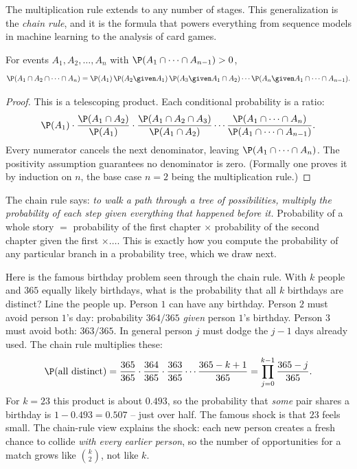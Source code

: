 The multiplication rule extends to any number of stages. This generalization is the \emph{chain rule}, and it is the formula that powers everything from sequence models in machine learning to the analysis of card games.

\begin{theorem}
\label{ch04:chain-rule}
For events $A_1, A_2, \dots, A_n$ with $\P(A_1 \cap \cdots \cap A_{n-1}) > 0$,
\[
\P(A_1 \cap A_2 \cap \cdots \cap A_n)
= \P(A_1)\,\P(A_2 \given A_1)\,\P(A_3 \given A_1 \cap A_2)\cdots
\P(A_n \given A_1 \cap \cdots \cap A_{n-1}).
\]
\end{theorem}

\begin{proof}
This is a telescoping product. Each conditional probability is a ratio:
\[
\P(A_1)\cdot\frac{\P(A_1\cap A_2)}{\P(A_1)}\cdot\frac{\P(A_1\cap A_2 \cap A_3)}{\P(A_1\cap A_2)}\cdots
\frac{\P(A_1\cap \cdots \cap A_n)}{\P(A_1\cap \cdots \cap A_{n-1})}.
\]
Every numerator cancels the next denominator, leaving $\P(A_1 \cap \cdots \cap A_n)$. The positivity assumption guarantees no denominator is zero. (Formally one proves it by induction on $n$, the base case $n=2$ being the multiplication rule.)
\end{proof}

\begin{intuitionbox}
The chain rule says: \emph{to walk a path through a tree of possibilities, multiply the probability of each step given everything that happened before it.} Probability of a whole story $=$ probability of the first chapter $\times$ probability of the second chapter given the first $\times \dots$. This is exactly how you compute the probability of any particular branch in a probability tree, which we draw next.
\end{intuitionbox}

\begin{example}
\label{ch04:ex-birthday-chain}
Here is the famous birthday problem seen through the chain rule. With $k$ people and $365$ equally likely birthdays, what is the probability that all $k$ birthdays are distinct? Line the people up. Person $1$ can have any birthday. Person $2$ must avoid person $1$'s day: probability $364/365$ \emph{given} person $1$'s birthday. Person $3$ must avoid both: $363/365$. In general person $j$ must dodge the $j-1$ days already used. The chain rule multiplies these:
\[
\P(\text{all distinct}) = \frac{365}{365}\cdot\frac{364}{365}\cdot\frac{363}{365}\cdots\frac{365-k+1}{365}
= \prod_{j=0}^{k-1}\frac{365-j}{365}.
\]
For $k = 23$ this product is about $0.493$, so the probability that \emph{some} pair shares a birthday is $1 - 0.493 = 0.507$ -- just over half. The famous shock is that $23$ feels small. The chain-rule view explains the shock: each new person creates a fresh chance to collide \emph{with every earlier person}, so the number of opportunities for a match grows like $\binom{k}{2}$, not like $k$.
\end{example}

